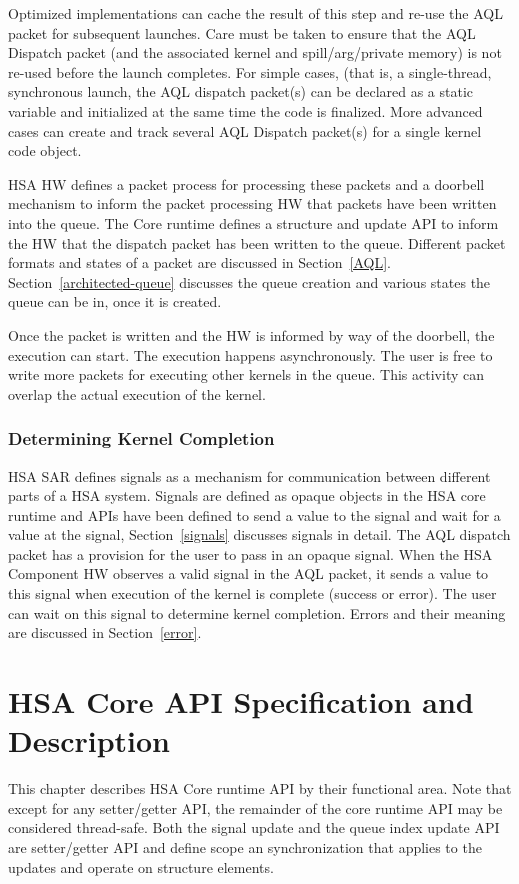 \documentclass[draft]{book}
\begin{document}
Optimized implementations can cache the result of this step and re-\/use the AQL
packet for subsequent launches. Care must be taken to ensure that the AQL
Dispatch packet (and the associated kernel and spill/arg/private memory) is not
re-\/used before the launch completes. For simple cases, (that is, a
single-\/thread, synchronous launch, the AQL dispatch packet(s) can be declared
as a static variable and initialized at the same time the code is
finalized. More advanced cases can create and track several AQL Dispatch
packet(s) for a single kernel code object.

HSA HW defines a packet process for processing these packets and a doorbell
mechanism to inform the packet processing HW that packets have been written into
the queue. The Core runtime defines a structure and update API to inform the HW
that the dispatch packet has been written to the queue. Different packet formats
and states of a packet are discussed in
Section~\ref{AQL}. Section~\ref{architected-queue} discusses the queue creation
and various states the queue can be in, once it is created.

Once the packet is written and the HW is informed by way of the doorbell, the
execution can start. The execution happens asynchronously. The user is free to
write more packets for executing other kernels in the queue. This activity can
overlap the actual execution of the kernel.

\subsection{Determining Kernel Completion}
HSA SAR defines signals as a mechanism for communication between different parts
of a HSA system. Signals are defined as opaque objects in the HSA core runtime
and APIs have been defined to send a value to the signal and wait for a value at
the signal, Section~\ref{signals} discusses signals in detail. The AQL dispatch
packet has a provision for the user to pass in an opaque signal. When the HSA
Component HW observes a valid signal in the AQL packet, it sends a value to this
signal when execution of the kernel is complete (success or error). The user can
wait on this signal to determine kernel completion. Errors and their meaning are
discussed in Section~\ref{error}.



\chapter{HSA Core API Specification and Description} \label{coreapi}
\hypertarget{coreapi}{} This chapter describes HSA Core runtime API by their
functional area. Note that except for any setter/getter API, the remainder of
the core runtime API may be considered thread-safe. Both the signal update and
the queue index update API are setter/getter API and define scope an
synchronization that applies to the updates and operate on structure elements.
\end{document}
